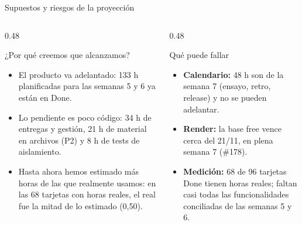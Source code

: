 \begin{frame}{Supuestos y riesgos de la proyección}
\begin{columns}[T,onlytextwidth]
\begin{column}{0.48\textwidth}
\begin{block}{¿Por qué creemos que alcanzamos?}
\scriptsize
\begin{itemize}
  \item El producto va adelantado: 133 h planificadas para las semanas 5 y 6 ya están en Done.
  \item Lo pendiente es poco código: 34 h de entregas y gestión, 21 h de material en archivos (P2) y 8 h de tests de aislamiento.
  \item Hasta ahora hemos estimado más horas de las que realmente usamos: en las 68 tarjetas con horas reales, el real fue la mitad de lo estimado (0,50).
\end{itemize}
\end{block}
\end{column}
\begin{column}{0.48\textwidth}
\begin{block}{Qué puede fallar}
\scriptsize
\begin{itemize}
  \item \textbf{Calendario:} 48 h son de la semana 7 (ensayo, retro, release) y no se pueden adelantar.
  \item \textbf{Render:} la base free vence cerca del 21/11, en plena semana 7 (\#178).
  \item \textbf{Medición:} 68 de 96 tarjetas Done tienen horas reales; faltan casi todas las funcionalidades conciliadas de las semanas 5 y 6.
\end{itemize}
\end{block}
\end{column}
\end{columns}
\vspace{0.2cm}
\centering
{}
\end{frame}
